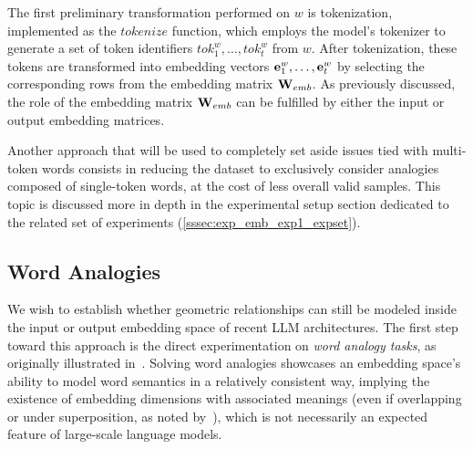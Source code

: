 The first preliminary transformation performed on $w$ is tokenization, implemented as the $\textit{tokenize}$ function, which employs the model's tokenizer to generate a set of token identifiers $tok_1^w,\ldots,tok_t^w$ from $w$.
After tokenization, these tokens are transformed into embedding vectors $\bm{\mathbf{e}}_1^w, \ldots, \bm{\mathbf{e}}_{t}^w$ by selecting the corresponding rows from the embedding matrix $\bm{\mathbf{W}}_{emb}$.
As previously discussed, the role of the embedding matrix $\bm{\mathbf{W}}_{emb}$ can be fulfilled by either the input or output embedding matrices.

Another approach that will be used to completely set aside issues tied with multi-token words consists in reducing the dataset to exclusively consider analogies composed of single-token words, at the cost of less overall valid samples.
This topic is discussed more in depth in the experimental setup section dedicated to the related set of experiments (\cref{sssec:exp_emb_exp1_expset}).

\subsection{Word Analogies}\label{ssec:method_embeddings_analogies}

We wish to establish whether geometric relationships can still be modeled inside the input or output embedding space of recent LLM architectures.
The first step toward this approach is the direct experimentation on \emph{word analogy tasks}, as originally illustrated in~\citet{mikolov2013}.
Solving word analogies showcases an embedding space's ability to model word semantics in a relatively consistent way, implying the existence of embedding dimensions with associated meanings (even if overlapping or under superposition, as noted by~\citet{elhage2022,henighan2023}), which is not necessarily an expected feature of large-scale language models.

